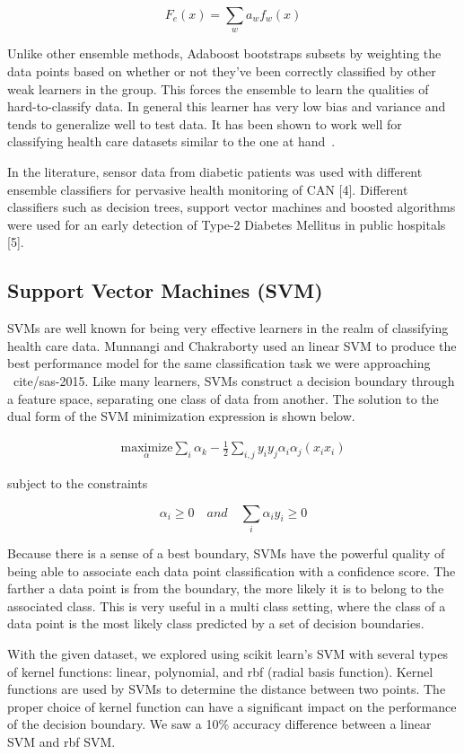 \documentclass[conference]{IEEEtran}
\begin{document}
\[
	F_{e}(x) = \sum_{w} a_{w}f_{w}(x)
\]

Unlike other ensemble methods, Adaboost bootstraps subsets by weighting the data points based on whether or not they've been correctly classified by other weak learners in the group. This forces the ensemble to learn the qualities of hard-to-classify data. In general this learner has very low bias and variance and tends to generalize well to test data. It has been shown to work well for classifying health care datasets similar to the one at hand~\cite{adaboost-breast-cancer}.

In the literature, sensor data from diabetic patients was used with different ensemble classifiers for pervasive health monitoring of CAN [4]. Different classifiers such as decision trees, support vector machines and boosted algorithms were used for an early detection of Type-2 Diabetes Mellitus in public hospitals [5].

\subsection{Support Vector Machines (SVM)}
SVMs are well known for being very effective learners in the realm of classifying health care data. Munnangi and Chakraborty used an linear SVM to produce the best performance model for the same classification task we were approaching ~cite/{sas-2015}. Like many learners, SVMs construct a decision boundary through a feature space, separating one class of data from another. The solution to the dual form of the SVM minimization expression is shown below.

\[
\begin{aligned}
\underset{\alpha}{\text{maximize}} \sum_i \alpha_k - \frac{1}{2} \sum_{i, j} y_i y_j \alpha_i \alpha_j (x_i x_i)
\end{aligned}
\]

subject to the constraints

\[
\alpha_i \ge 0 \quad and \quad \sum_i \alpha_i y_i \ge 0
\]

Because there is a sense of a best boundary, SVMs have the powerful quality of being able to associate each data point classification with a confidence score. The farther a data point is from the boundary, the more likely it is to belong to the associated class. This is very useful in a multi class setting, where the class of a data point is the most likely class predicted by a set of decision boundaries.

With the given dataset, we explored using scikit learn's SVM with several types of kernel functions: linear, polynomial, and rbf (radial basis function). Kernel functions are used by SVMs to determine the distance between two points. The proper choice of kernel function can have a significant impact on the performance of the decision boundary. We saw a 10\% accuracy difference between a linear SVM and rbf SVM.
\end{document}

